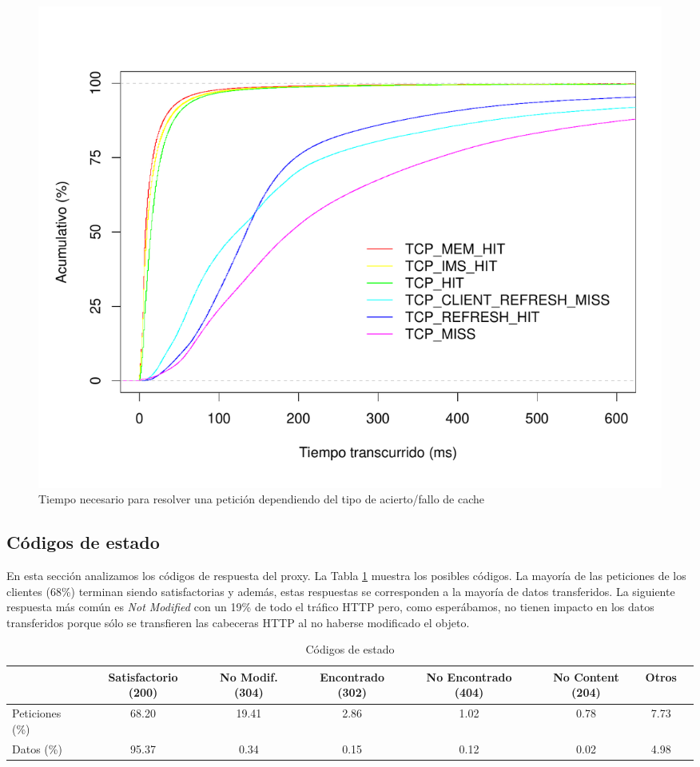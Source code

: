 \documentclass[twocolumn]{Jornadas}
\begin{document}
\begin{figure}[ht!]
\includegraphics[scale=0.30]{figures/ElapsedTimeAll_1k_full.pdf} 
\caption{Tiempo necesario para resolver una petición dependiendo del tipo de acierto/fallo de cache}
\label{fig:elapsed}
\end{figure}

\subsection{Códigos de estado}
En esta sección analizamos los códigos de respuesta del proxy. La Tabla \ref{table:codigos} muestra los posibles códigos. La mayoría de las peticiones de los clientes (68\%) terminan siendo satisfactorias y además, estas respuestas se corresponden a la mayoría de datos transferidos. La siguiente respuesta más común es \textit{Not Modified} con un 19\% de todo el tráfico HTTP pero, como esperábamos, no tienen impacto en los datos transferidos porque sólo se transfieren las cabeceras HTTP al no haberse modificado el objeto.

\begin{table}
\centering
\renewcommand{\baselinestretch}{1.5}
\scriptsize
\begin{tabular}{|l||c|c|c|c|c|c|c|} \hline
  & Satisfactorio (200) & No Modif. (304) & Encontrado (302) & No Encontrado (404) & No Content (204) &Otros\\\hline\hline
Peticiones (\%)    & 68.20  & 19.41 & 2.86 & 1.02 & 0.78 & 7.73            \\\hline  
Datos (\%)        & 95.37   & 0.34 & 0.15 & 0.12 & 0.02 & 4.98             \\\hline 
\end{tabular}
\caption{Códigos de estado}
\label{table:codigos}
\end{table}
\end{document}
